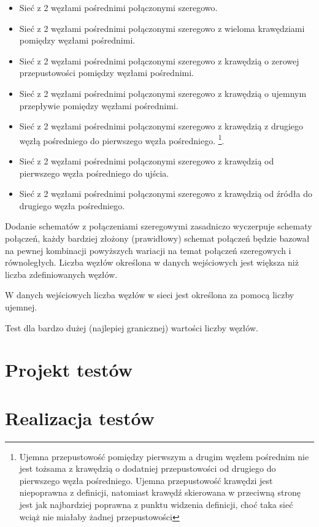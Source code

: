 \documentclass[10pt]{dokument-tiwo}
\begin{document}
\begin{itemize}
    \item Sieć z 2 węzłami pośrednimi połączonymi szeregowo.
    \item Sieć z 2 węzłami pośrednimi połączonymi szeregowo z wieloma krawędziami pomiędzy węzłami pośrednimi.
    \item Sieć z 2 węzłami pośrednimi połączonymi szeregowo z krawędzią o zerowej przepustowości pomiędzy węzłami pośrednimi.
    \item Sieć z 2 węzłami pośrednimi połączonymi szeregowo z krawędzią o ujemnym przepływie pomiędzy węzłami pośrednimi.
    \item Sieć z 2 węzłami pośrednimi połączonymi szeregowo z krawędzią z drugiego węzłą pośredniego do pierwszego węzła pośredniego.
\footnote{Ujemna przepustowość pomiędzy pierwszym a drugim węzłem pośrednim nie jest tożsama z krawędzią o dodatniej przepustowości od drugiego do pierwszego węzła pośredniego. Ujemna przepustowość krawędzi jest niepoprawna z definicji, natomiast krawędź skierowana w przeciwną stronę jest jak najbardziej poprawna z punktu widzenia definicji, choć taka sieć wciąż nie miałaby żadnej przepustowości}.
    \item Sieć z 2 węzłami pośrednimi połączonymi szeregowo z krawędzią od pierwszego węzła pośredniego do ujścia.
    \item Sieć z 2 węzłami pośrednimi połączonymi szeregowo z krawędzią od źródła do drugiego węzła pośredniego.
\end{itemize}
Dodanie schematów z połączeniami szeregowymi zasadniczo wyczerpuje schematy połączeń, każdy bardziej złożony (prawidłowy) schemat połączeń będzie bazował na pewnej kombinacji powyższych wariacji na temat połączeń szeregowych i równoległych.
Liczba węzłów określona w danych wejściowych jest większa niż liczba zdefiniowanych węzłów.

W danych wejściowych liczba węzłów w sieci jest określona za pomocą liczby ujemnej.

Test dla bardzo dużej (najlepiej granicznej) wartości liczby węzłów.


\section{Projekt testów}


\section{Realizacja testów}
\end{document}

